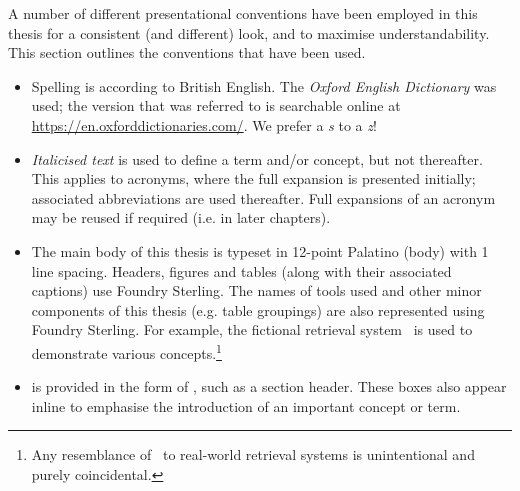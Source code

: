 
\begin{preamble}
{}

A number of different presentational conventions have been employed in this thesis for a consistent (and different) look, and to maximise understandability. This section outlines the conventions that have been used.



\noindent{}
\begin{itemize}
    \item{Spelling is according to British English. The \emph{Oxford English Dictionary} was used; the version that was referred to is searchable online at \url{https://en.oxforddictionaries.com/}. We prefer a \emph{s} to a \emph{z}!}
\end{itemize}

\noindent{}
\begin{itemize}
    \item{\emph{Italicised text} is used to define a term and/or concept, but not thereafter. This applies to acronyms, where the full expansion is presented initially; associated abbreviations are used thereafter. Full expansions of an acronym may be reused if required (i.e. in later chapters).}
    
    \item{The main body of this thesis is typeset in 12-point Palatino (body) with 1 line spacing. Headers, figures and tables (along with their associated captions) use \headerfont\selectfont Foundry Sterling\normalfont\selectfont. The names of tools used and other minor components of this thesis (e.g. table groupings) are also represented using \headerfont\selectfont Foundry Sterling\normalfont\selectfont. For example, the fictional retrieval system \searchlogo~is used to demonstrate various concepts.\footnote{Any resemblance of \searchlogo~to real-world retrieval systems is unintentional and purely coincidental.}}
    
    \item{ is provided in the form of , such as a section header. These boxes also appear inline to emphasise the introduction of an important concept or term.}
    
    \begin{itemize}
        

\end{itemize}
\end{itemize}
\end{preamble}
